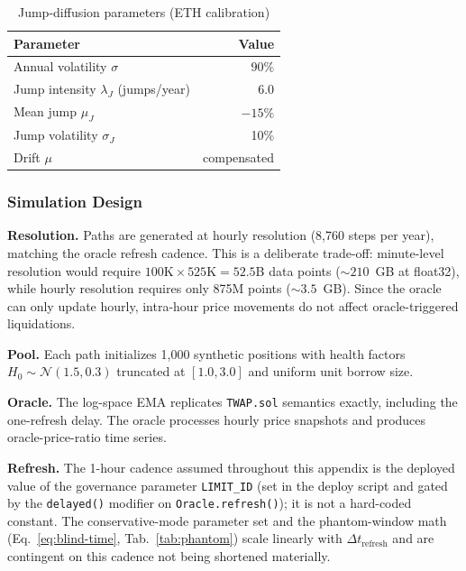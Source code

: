 \documentclass[10pt,a4paper,twocolumn]{article}
\begin{document}
\begin{table}[htbp]
\centering
\caption{Jump-diffusion parameters (ETH calibration)}
\label{tab:jd-params}
\small
\begin{tabularx}{0.85\columnwidth}{@{}>{\raggedright\arraybackslash}X r@{}}
\toprule
Parameter & Value \\
\midrule
Annual volatility $\sigma$ & 90\% \\
Jump intensity $\lambda_J$ (jumps/year) & 6.0 \\
Mean jump $\mu_J$ & $-15\%$ \\
Jump volatility $\sigma_J$ & 10\% \\
Drift $\mu$ & compensated \\
\bottomrule
\end{tabularx}
\end{table}

\subsubsection{Simulation Design}
\label{subsec:bd-sim_design}

\textbf{Resolution.} Paths are generated at hourly resolution (8{,}760 steps per year), matching the oracle refresh cadence. This is a deliberate trade-off: minute-level resolution would require $100\text{K} \times 525\text{K} = 52.5$B data points (${\sim}210$~GB at float32), while hourly resolution requires only 875M points (${\sim}3.5$~GB). Since the oracle can only update hourly, intra-hour price movements do not affect oracle-triggered liquidations.

\textbf{Pool.} Each path initializes 1{,}000 synthetic positions with health factors $H_0 \sim \mathcal{N}(1.5, 0.3)$ truncated at $[1.0, 3.0]$ and uniform unit borrow size.

\textbf{Oracle.} The log-space EMA replicates \texttt{TWAP.sol} semantics exactly, including the one-refresh delay. The oracle processes hourly price snapshots and produces oracle-price-ratio time series.

\textbf{Refresh.} The 1-hour cadence assumed throughout this appendix is the deployed value of the governance parameter \texttt{LIMIT\_ID} (set in the deploy script and gated by the \texttt{delayed()} modifier on \texttt{Oracle.refresh()}); it is not a hard-coded constant. The conservative-mode parameter set and the phantom-window math (Eq.~\ref{eq:blind-time}, Tab.~\ref{tab:phantom}) scale linearly with $\Delta t_{\text{refresh}}$ and are contingent on this cadence not being shortened materially.
\end{document}

